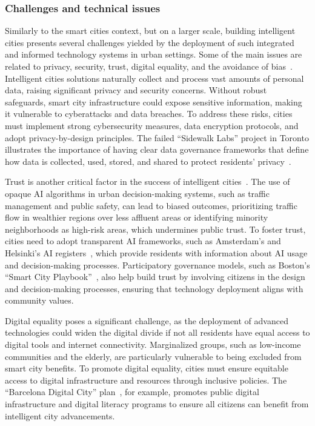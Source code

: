\documentclass[smartcities,article,submit,pdftex,moreauthors]{Definitions/mdpi}
\begin{document}
\subsubsection{Challenges and technical issues}

Similarly to the smart cities context, but on a larger scale, building intelligent cities presents several challenges yielded by the deployment of such integrated and informed technology systems in urban settings. Some of the main issues are related to privacy, security, trust, digital equality, and the avoidance of bias~\cite{BridgingEthicsPractice,EthicsSmartCityAI}. Intelligent cities solutions naturally collect and process vast amounts of personal data, raising significant privacy and security concerns. Without robust safeguards, smart city infrastructure could expose sensitive information, making it vulnerable to cyberattacks and data breaches. To address these risks, cities must implement strong cybersecurity measures, data encryption protocols, and adopt privacy-by-design principles. The failed ``Sidewalk Labs'' project in Toronto illustrates the importance of having clear data governance frameworks that define how data is collected, used, stored, and shared to protect residents' privacy~\cite{SidewalkToronto_Trust}.

Trust is another critical factor in the success of intelligent cities~\cite{TrustworthyAIReview}. The use of opaque AI algorithms in urban decision-making systems, such as traffic management and public safety, can lead to biased outcomes, prioritizing traffic flow in wealthier regions over less affluent areas or identifying minority neighborhoods as high-risk areas, which undermines public trust. To foster trust, cities need to adopt transparent AI frameworks, such as Amsterdam's and Helsinki's AI registers~\cite{AmsterdamHelsinki_1}, which provide residents with information about AI usage and decision-making processes. Participatory governance models, such as Boston's ``Smart City Playbook''~\cite{BostonSmartCityPlaybook}, also help build trust by involving citizens in the design and decision-making processes, ensuring that technology deployment aligns with community values.

Digital equality poses a significant challenge, as the deployment of advanced technologies could widen the digital divide if not all residents have equal access to digital tools and internet connectivity. Marginalized groups, such as low-income communities and the elderly, are particularly vulnerable to being excluded from smart city benefits. To promote digital equality, cities must ensure equitable access to digital infrastructure and resources through inclusive policies. The ``Barcelona Digital City'' plan~\cite{BarcelonaDigitalCity}, for example, promotes public digital infrastructure and digital literacy programs to ensure all citizens can benefit from intelligent city advancements.
\end{document}

